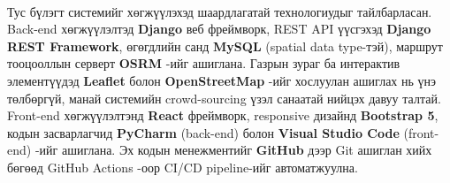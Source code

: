 \paragraph{} Тус бүлэгт системийг хөгжүүлэхэд шаардлагатай технологиудыг тайлбарласан. Back-end хөгжүүлэлтэд \textbf{Django} веб фреймворк, REST API үүсгэхэд \textbf{Django REST Framework}, өгөгдлийн санд \textbf{MySQL} (spatial data type-тэй), маршрут тооцооллын серверт \textbf{OSRM} -ийг ашиглана. Газрын зураг ба интерактив элементүүдэд \textbf{Leaflet} болон \textbf{OpenStreetMap} -ийг хослуулан ашиглах нь үнэ төлбөргүй, манай системийн crowd-sourcing үзэл санаатай нийцэх давуу талтай. Front-end хөгжүүлэлтэнд \textbf{React} фреймворк, responsive дизайнд \textbf{Bootstrap 5}, кодын засварлагчид \textbf{PyCharm} (back-end) болон \textbf{Visual Studio Code} (front-end) -ийг ашиглана. Эх кодын менежментийг \textbf{GitHub} дээр Git ашиглан хийх бөгөөд GitHub Actions -оор CI/CD pipeline-ийг автоматжуулна.
